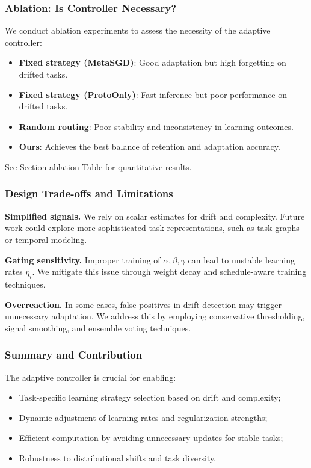 \documentclass[conference]{IEEEtran}
\begin{document}
\subsubsection*{Ablation: Is Controller Necessary?}

We conduct ablation experiments to assess the necessity of the adaptive controller:
\begin{itemize}
    \item \textbf{Fixed strategy (MetaSGD)}: Good adaptation but high forgetting on drifted tasks.
    \item \textbf{Fixed strategy (ProtoOnly)}: Fast inference but poor performance on drifted tasks.
    \item \textbf{Random routing}: Poor stability and inconsistency in learning outcomes.
    \item \textbf{Ours}: Achieves the best balance of retention and adaptation accuracy.
\end{itemize}

See Section ablation
Table for quantitative results.

\subsubsection*{Design Trade-offs and Limitations}

\textbf{Simplified signals.} We rely on scalar estimates for drift and complexity. Future work could explore more sophisticated task representations, such as task graphs or temporal modeling.

\textbf{Gating sensitivity.} Improper training of $\alpha, \beta, \gamma$ can lead to unstable learning rates $\eta_i$. We mitigate this issue through weight decay and schedule-aware training techniques.

\textbf{Overreaction.} In some cases, false positives in drift detection may trigger unnecessary adaptation. We address this by employing conservative thresholding, signal smoothing, and ensemble voting techniques.

\subsubsection*{Summary and Contribution}

The adaptive controller is crucial for enabling:
\begin{itemize}
    \item Task-specific learning strategy selection based on drift and complexity;
    \item Dynamic adjustment of learning rates and regularization strengths;
    \item Efficient computation by avoiding unnecessary updates for stable tasks;
    \item Robustness to distributional shifts and task diversity.
\end{itemize}
\end{document}
